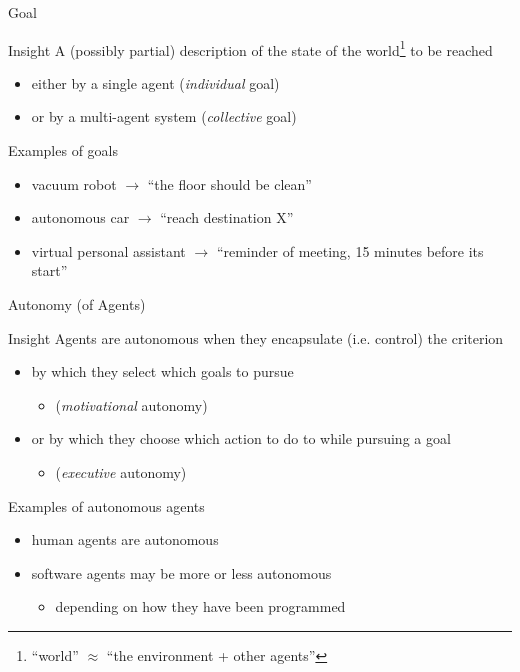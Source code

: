 \documentclass[presentation]{beamer}\mode<presentation>{\usetheme{AMSBolognaFC}}
\begin{document}
\begin{frame}[c]{Goal}
%
\begin{block}{Insight}
	A (possibly partial) description of the state of the world\footnote{``world'' $\approx$ ``the environment + other agents''} to be reached
	\begin{itemize}
		\item either by a single agent (\emph{individual} goal)
		\item or by a multi-agent system (\emph{collective} goal)
	\end{itemize}
\end{block}
%
\begin{exampleblock}{Examples of goals}
	\begin{itemize}
		\item vacuum robot $\rightarrow$ ``the floor should be clean''
		\item autonomous car $\rightarrow$ ``reach destination X''
		\item virtual personal assistant $\rightarrow$ ``reminder of meeting, 15 minutes before its start''
	\end{itemize}
\end{exampleblock}
%
\end{frame}

\begin{frame}[c]{Autonomy (of Agents)}
%
\begin{block}{Insight}
	Agents are \alert{autonomous} when they encapsulate (i.e. control) the criterion
	\begin{itemize}
		\item by which they select which goals to pursue
		\begin{itemize}
			\item (\emph{motivational} autonomy)
		\end{itemize}
		\item or by which they choose which action to do to while pursuing a goal
		\begin{itemize}
			\item (\emph{executive} autonomy)
		\end{itemize}
	\end{itemize}
\end{block}
%
\begin{exampleblock}{Examples of autonomous agents}
	\begin{itemize}
		\item human agents are autonomous
		\item software agents may be more or less autonomous
		\begin{itemize}
			\item depending on how they have been programmed
		\end{itemize}
	\end{itemize}
\end{exampleblock}
%
\end{frame}
\end{document}
